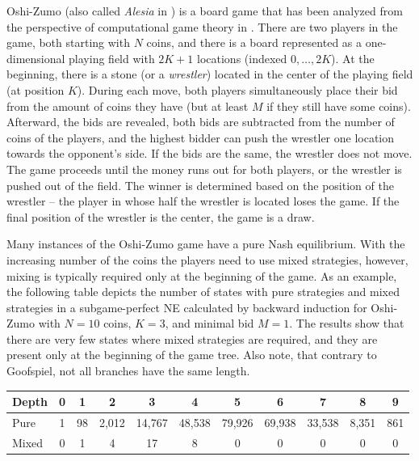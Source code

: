 Oshi-Zumo (also called {\it Alesia} in \cite{Perolat15Approximate}) is a board game that has been analyzed from the perspective of
computational game theory in \cite{buro2003}.
There are two players in the game, both starting with $N$ coins, and there is a board represented as a one-dimensional playing field with $2K+1$ locations (indexed $0, \ldots, 2K$).
At the beginning, there is a stone (or a \emph{wrestler}) located in the center of the playing field (\ie at position $K$).
During each move, both players simultaneously place their bid from the amount of coins they have (but at least $M$ if they still have some coins).
Afterward, the bids are revealed, both bids are subtracted from the number of coins of the players, and the highest bidder can push the wrestler one location towards the opponent's side.
If the bids are the same, the wrestler does not move.
The game proceeds until the money runs out for both players, or the wrestler is pushed out of the field.
The winner is determined based on the position of the wrestler -- the player in whose half the wrestler is located loses the game.
If the final position of the wrestler is the center, the game is a draw.

Many instances of the Oshi-Zumo game have a pure Nash equilibrium.
With the increasing number of the coins the players need to use mixed strategies, however, mixing is typically required only at the beginning of the game.
As an example, the following table depicts the number of states with pure strategies and mixed strategies in a subgame-perfect NE calculated by backward induction for Oshi-Zumo with $N=10$ coins, $K=3$, and minimal bid $M=1$. The results show that there are very few states where mixed strategies are required, and they are present only at the beginning of the game tree. Also note, that contrary to Goofspiel, not all branches have the same length.

\vspace{0.1cm}

\begin{center}
\small
\begin{tabular}{|l|c|c|c|c|c|c|c|c|c|c|}
\hline Depth & 0 & 1 & 2 & 3 & 4 & 5 & 6 & 7 & 8 & 9\\
\hline Pure  & 1 & 98 & 2,012 & 14,767 & 48,538 & 79,926 & 69,938 & 33,538 & 8,351 & 861\\
\hline Mixed & 0 &  1 &  4 &  17 & 8 & 0 & 0 & 0 & 0 & 0 \\
\hline
\end{tabular}
\end{center}

